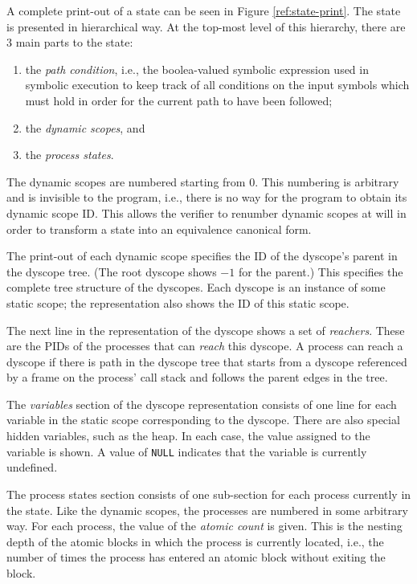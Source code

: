A complete print-out of a state can be seen in Figure
\ref{ref:state-print}.  The state is presented in hierarchical way.
At the top-most level of this hierarchy, there are 3 main parts to the
state:
\begin{enumerate}
\item the \emph{path condition}, i.e., the boolea-valued symbolic
  expression used in symbolic execution to keep track of all
  conditions on the input symbols which must hold in order for the
  current path to have been followed;
\item the \emph{dynamic scopes}, and
\item the \emph{process states}.
\end{enumerate}

The dynamic scopes are numbered starting from 0.  This numbering is
arbitrary and is invisible to the program, i.e., there is no way for
the program to obtain its dynamic scope ID.  This allows the verifier
to renumber dynamic scopes at will in order to transform a state into
an equivalence canonical form.

The print-out of each dynamic scope specifies the ID of the dyscope's
parent in the dyscope tree.  (The root dyscope shows $-1$ for the
parent.)  This specifies the complete tree structure of the dyscopes.
Each dyscope is an instance of some static scope; the representation
also shows the ID of this static scope.

The next line in the representation of the dyscope shows a set of
\emph{reachers}.  These are the PIDs of the processes that can
\emph{reach} this dyscope.  A process can reach a dyscope if there is
path in the dyscope tree that starts from a dyscope referenced by a
frame on the process' call stack and follows the parent edges in the
tree.

The \emph{variables} section of the dyscope representation consists of
one line for each variable in the static scope corresponding to the
dyscope.  There are also special hidden variables, such as the heap.
In each case, the value assigned to the variable is shown.  A value of
\texttt{NULL} indicates that the variable is currently undefined.

The process states section consists of one sub-section for each
process currently in the state.  Like the dynamic scopes, the
processes are numbered in some arbitrary way. For each process, the
value of the \emph{atomic count} is given.  This is the nesting depth
of the atomic blocks in which the process is currently located, i.e.,
the number of times the process has entered an atomic block without
exiting the block.

